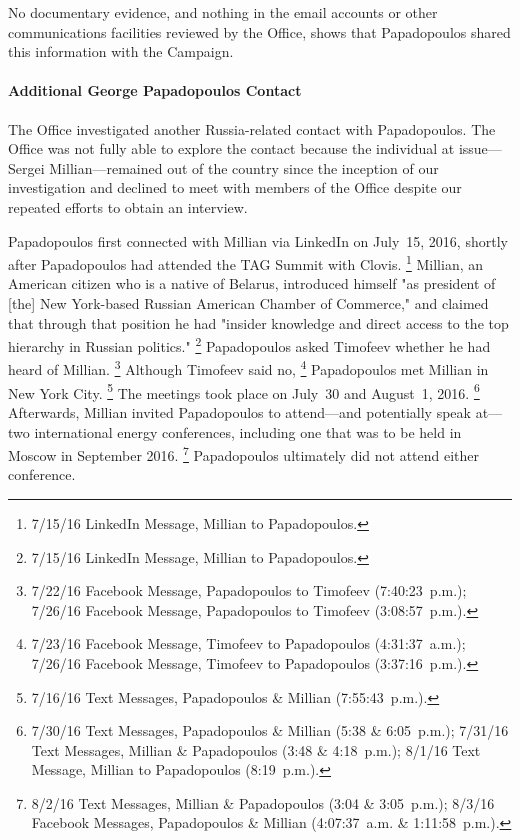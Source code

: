 No documentary evidence, and nothing in the email accounts or other communications facilities reviewed by the Office, shows that Papadopoulos shared this information with the Campaign.

\paragraph{Additional George Papadopoulos Contact}

The Office investigated another Russia-related contact with Papadopoulos.
The Office was not fully able to explore the contact because the individual at issue---Sergei Millian---remained out of the country since the inception of our investigation and declined to meet with members of the Office despite our repeated efforts to obtain an interview.

Papadopoulos first connected with Millian via LinkedIn on July~15, 2016, shortly after Papadopoulos had attended the TAG Summit with Clovis.%
\footnote{7/15/16 LinkedIn Message, Millian to Papadopoulos.}
Millian, an American citizen who is a native of Belarus, introduced himself "as president of [the] New York-based Russian American Chamber of Commerce," and claimed that through that position he had "insider knowledge and direct access to the top hierarchy in Russian politics."%
\footnote{7/15/16 LinkedIn Message, Millian to Papadopoulos.}
Papadopoulos asked Timofeev whether he had heard of Millian.%
\footnote{7/22/16 Facebook Message, Papadopoulos to Timofeev (7:40:23~p.m.);
7/26/16 Facebook Message, Papadopoulos to Timofeev (3:08:57~p.m.).}
Although Timofeev said no,%
\footnote{7/23/16 Facebook Message, Timofeev to Papadopoulos (4:31:37~a.m.);
7/26/16 Facebook Message, Timofeev to Papadopoulos (3:37:16~p.m.).}
Papadopoulos met Millian in New York City.%
\footnote{7/16/16 Text Messages, Papadopoulos \& Millian (7:55:43~p.m.).}
The meetings took place on July~30 and August~1, 2016.%
\footnote{7/30/16 Text Messages, Papadopoulos \& Millian (5:38 \& 6:05~p.m.);
7/31/16 Text Messages, Millian \& Papadopoulos (3:48 \& 4:18~p.m.);
8/1/16 Text Message, Millian to Papadopoulos (8:19~p.m.).}
Afterwards, Millian invited Papadopoulos to attend---and potentially speak at---two international energy conferences, including one that was to be held in Moscow in September 2016.%
\footnote{8/2/16 Text Messages, Millian \& Papadopoulos (3:04 \& 3:05~p.m.);
8/3/16 Facebook Messages, Papadopoulos \& Millian (4:07:37~a.m. \& 1:11:58~p.m.).}
Papadopoulos ultimately did not attend either conference.

